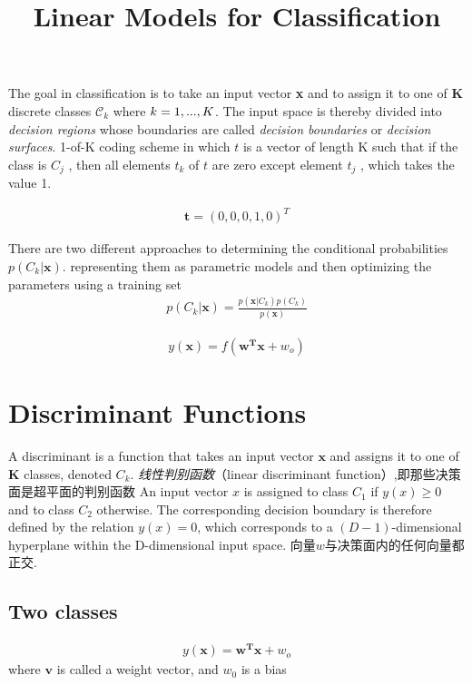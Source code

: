 \documentclass[a4paper]{article}
\begin{document}
\title{Linear Models for Classification}
\author{}
\maketitle

The goal in classification is to take an input vector \textbf{x} and to assign it to one of \textbf{K} discrete classes $\mathcal{C}_k $ where $ \mathnormal{k} = 1,...,\mathnormal{K} $.
 The input space is thereby divided into \textit{decision regions} whose
 boundaries are called \textit{decision boundaries} or
 \textit{decision surfaces}.
1-of-K coding scheme in which $t$ is a vector of length
 K such that if the class is $C_j$ , then all elements $t_k$ of $t$
 are zero except element $t_j$ , which takes the value 1.

\begin{align}
\mathbf{t} = (0,0,0,1,0)^T
\end{align}

There are two different approaches to determining the conditional probabilities
 $p(C_k|\mathbf{x})$. representing them as parametric models and then
 optimizing the parameters using a training set
\begin{align}
p(C_k|\mathbf{x}) = \frac { p(\mathbf{x}|C_k) p(C_k) }{p(\mathbf{x})}
\end{align}

\begin{align}
y(\mathbf{x}) = f(\mathbf{w^T}\mathbf{x} + w_o)
\end{align}


\section{Discriminant Functions}
A discriminant is a function that takes an input vector $\mathbf{x}$ and assigns it to one of $\mathbf{K}$ classes, denoted $C_k$.
\emph{线性判别函数}（linear discriminant function）,即那些决策面是超平面的判别函数
An input vector $x$ is assigned to class $C_1$ if $y(x) \geq 0$ and to class $C_2$ otherwise. The corresponding decision boundary is therefore defined by the relation $y(x) = 0$, which corresponds to a $(D − 1)$-dimensional hyperplane within the D-dimensional input space.
向量$w$与决策面内的任何向量都正交.

\subsection{Two classes}

\begin{align}
y(\mathbf{x}) = \mathbf{w^T}\mathbf{x} + w_o
\end{align}
where $\mathbf{v}$ is called a weight vector, and $w_0$ is a bias
\end{document}
